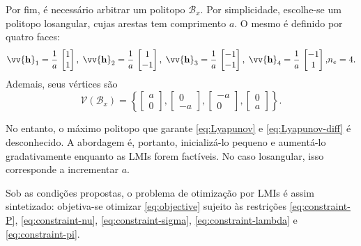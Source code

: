 \documentclass{ppgeesa}
\newcommand*{\Curly}[1]{\left\{#1\right\}}
\newcommand*{\Set}[1]{\Curly{#1}}
\newcommand*{\Prod}{\,}
\newcommand*{\Bold}[1]{\boldsymbol{\mathbf{#1}}}
\newcommand*{\Vect}[1]{\vv{\Bold{#1}}}
\begin{document}
Por fim, é necessário arbitrar um politopo $\mathcal{B}_x$.
Por simplicidade, escolhe-se um politopo losangular, cujas arestas tem comprimento $a$.
O mesmo é definido por quatro faces:
\begin{equation}
  \begin{gathered}
    \Vect{h}_1 = \dfrac{1}{a} \Prod \begin{bmatrix} 1 \\ 1 \end{bmatrix}
    ,\;
    \Vect{h}_2 = \dfrac{1}{a} \Prod \begin{bmatrix} 1 \\ -1 \end{bmatrix}
    ,\;
    \Vect{h}_3 = \dfrac{1}{a} \Prod \begin{bmatrix} -1 \\ -1 \end{bmatrix}
    ,\;
    \Vect{h}_4 = \dfrac{1}{a} \Prod \begin{bmatrix} -1 \\ 1 \end{bmatrix}
    ,
  \end{gathered}
  \\
  n_e = 4
  .
\end{equation}
Ademais, seus vértices são
\begin{equation}\label{eq:vertex}
  \mathcal{V}(\mathcal{B}_x) = \Set{
    \begin{bmatrix} a \\ 0 \end{bmatrix}
    ,
    \begin{bmatrix} 0 \\ -a \end{bmatrix}
    ,
    \begin{bmatrix} -a \\ 0 \end{bmatrix}
    ,
    \begin{bmatrix} 0 \\ a \end{bmatrix}
  }
  .
\end{equation}

No entanto, o máximo politopo que garante \eqref{eq:Lyapunov} e \eqref{eq:Lyapunov-diff} é desconhecido.
A abordagem é, portanto, inicializá-lo pequeno e aumentá-lo gradativamente enquanto as LMIs forem factíveis.
No caso losangular, isso corresponde a incrementar $a$.

Sob as condições propostas, o problema de otimização por LMIs é assim sintetizado:
objetiva-se otimizar \eqref{eq:objective} sujeito às restrições \eqref{eq:constraint-P}, \eqref{eq:constraint-nu}, \eqref{eq:constraint-sigma}, \eqref{eq:constraint-lambda} e \eqref{eq:constraint-pi}.
\end{document}
